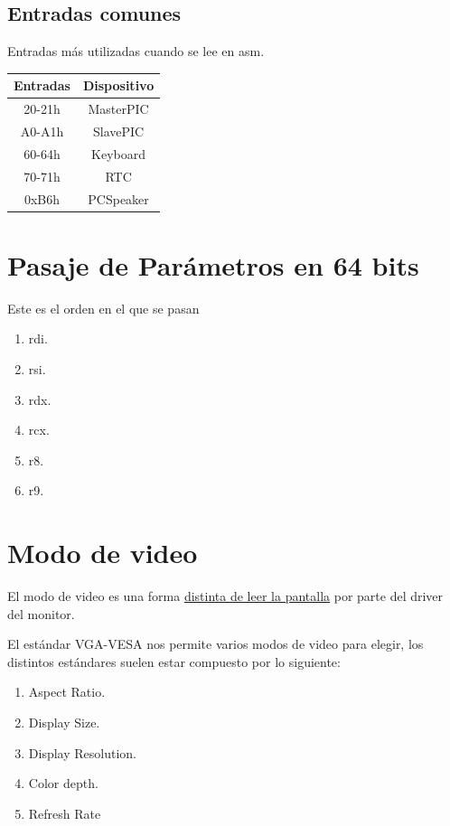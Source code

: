 \documentclass[]{article}
\begin{document}
\subsection*{Entradas comunes}
Entradas m\'as utilizadas cuando se lee en asm.
\begin{center}
	\begin{tabular}{ |c|c| }
		\hline
		Entradas & Dispositivo\\
		\hline	
		20-21h & MasterPIC\\
		A0-A1h & SlavePIC\\
		60-64h & Keyboard\\
		70-71h & RTC\\
		0xB6h & PCSpeaker\\
		\hline
	\end{tabular}
\end{center}

\section*{Pasaje de Par\'ametros en 64 bits}
Este es el orden en el que se pasan

\begin{center}
	\begin{enumerate}
		\item rdi.
		\item rsi.
		\item rdx.
		\item rcx.
		\item r8.
		\item r9.
	\end{enumerate}
\end{center}

\section*{Modo de video}

El modo de video es una forma \underline{distinta de leer la pantalla} por parte del driver del monitor.

El est\'andar VGA-VESA nos permite varios modos de video para elegir, los distintos est\'andares suelen estar compuesto por lo siguiente:

	\begin{enumerate}
		\item Aspect Ratio.
		\item Display Size.
		\item Display Resolution.
		\item Color depth.
		\item Refresh Rate
	\end{enumerate}
\end{document}
